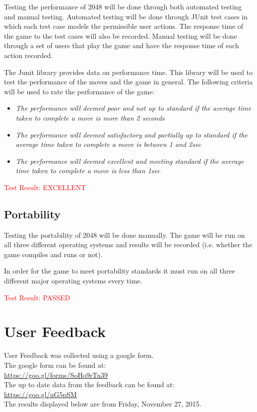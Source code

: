 \documentclass[12pt]{article}
\begin{document}
Testing the performance of 2048 will be done through both automated testing and manual testing. Automated testing will be done through JUnit test cases in which each test case models the permissible user actions. The response time of the game to the test cases will also be recorded. Manual testing will be done through a set of users that play the game and have the response time of each action recorded.
\par The Junit library provides data on performance time. This library will be used to test the performance of the moves and the game in general. The following criteria will be used to rate the performance of the game:
\begin{itemize}
\item\emph{The performance will deemed poor and not up to standard if the average time taken to complete a move is more than 2 seconds}
\item\emph{The performance will deemed satisfactory and partially up to standard if the average time taken to complete a move is between 1 and 2sec}
\item\emph{The performance will deemed excellent and meeting standard if the average time taken to complete a move is less than 1sec}
\end{itemize}

\textcolor{red}{Test Result: EXCELLENT}

\subsection{Portability}

Testing the portability of 2048 will be done manually. The game will be run on all three different operating systems and results will be recorded (i.e. whether the game compiles and runs or not).
\par In order for the game to meet portability standards it must run on all three different major operating systems every time.

\textcolor{red}{Test Result: PASSED}

\section{User Feedback}
User Feedback was collected using a google form. \\
The google form can be found at: \\ \url{https://goo.gl/forms/SoHo9rTn39} \\
The up to date data from the feedback can be found at:\\ \url{https://goo.gl/uG5pSM} \\
The results displayed below are from Friday, November 27, 2015.
\end{document}
